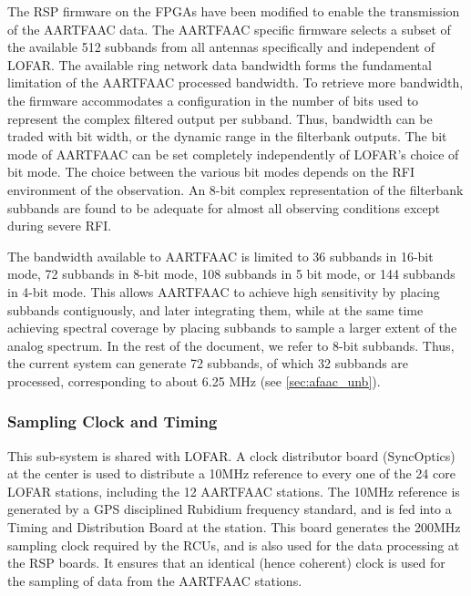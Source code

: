 \documentclass{ws-jai}
\begin{document}
The RSP firmware on  the FPGAs have been modified to  enable the transmission of
the  AARTFAAC data.   The AARTFAAC  specific firmware  selects a  subset of  the
available 512 subbands from all  antennas specifically and independent of LOFAR.
The available  ring network data  bandwidth forms the fundamental  limitation of
the  AARTFAAC processed  bandwidth.  To  retrieve more  bandwidth, the  firmware
accommodates a configuration in the number of bits used to represent the complex
filtered output per  subband.  Thus, bandwidth can be traded  with bit width, or
the dynamic range  in the filterbank outputs.   The bit mode of  AARTFAAC can be
set completely independently of LOFAR's choice  of bit mode.  The choice between
the various  bit modes depends  on the RFI  environment of the  observation.  An
8-bit complex representation of the filterbank subbands are found to be adequate
for almost all observing conditions except during severe RFI.

The bandwidth available to AARTFAAC is limited to 36 subbands in 16-bit mode, 72
subbands in  8-bit mode, 108 subbands  in 5 bit  mode, or 144 subbands  in 4-bit
mode.   This allows  AARTFAAC to  achieve high  sensitivity by  placing subbands
contiguously,  and later  integrating them,  while  at the  same time  achieving
spectral coverage  by placing subbands to  sample a larger extent  of the analog
spectrum. In the  rest of the document,  we refer to 8-bit  subbands.  Thus, the
current system  can generate 72  subbands, of  which 32 subbands  are processed,
corresponding to about 6.25 MHz (see \ref{sec:afaac_unb}).\\

\subsubsection  {Sampling Clock and  Timing}
 This sub-system is  shared with
LOFAR.  A  clock  distributor  board  (SyncOptics) at  the  center  is  used  to
distribute  a 10MHz  reference  to every  one  of the  24  core LOFAR  stations,
including the 12  AARTFAAC stations.  The 10MHz reference is  generated by a GPS
disciplined  Rubidium  frequency  standard,  and   is  fed  into  a  Timing  and
Distribution Board  at the  station.  This board  generates the  200MHz sampling
clock required by the RCUs, and is also  used for the data processing at the RSP
boards. It  ensures that  an identical  (hence coherent) clock  is used  for the
sampling of data from the AARTFAAC stations.
\end{document}
